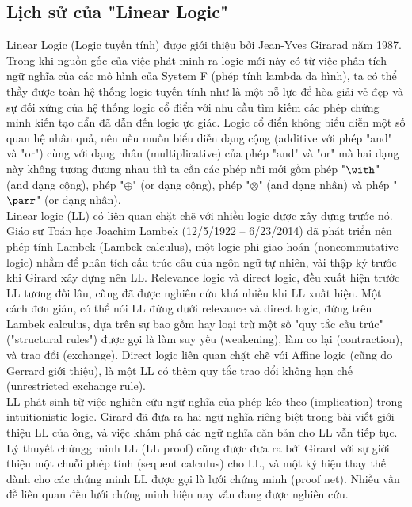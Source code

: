 \documentclass[a4paper]{article}
\begin{document}
\subsection{Lịch sử của "Linear Logic"}
Linear Logic (Logic tuyến tính) được giới thiệu bởi Jean-Yves Girarad năm 1987. Trong khi nguồn gốc của việc phát minh ra logic mới này có từ việc phân tích ngữ nghĩa của các mô hình của System F (phép tính lambda đa hình), ta có thể thầy được toàn hệ thống logic tuyến tính như là một nỗ lực để hòa giải vẻ đẹp và sự đối xứng của hệ thống logic cổ điển với nhu cầu tìm kiếm các phép chứng minh kiến tạo dẩn đã dẫn đến logic ực giác. 
Logic cổ điển không biểu diễn một số quan hệ nhân quả, nên nếu muốn biểu diễn dạng cộng (additive với phép "and" và "or") cùng với dạng nhân (multiplicative) của phép "and" và "or" mà hai dạng này không tương đương nhau thì ta cần các phép nối mới gồm phép "$\with$" (and dạng cộng), phép "$\oplus$" (or dạng cộng), phép "$\otimes$" (and dạng nhân) và phép "$\parr$" (or dạng nhân).\\

Linear logic (LL) có liên quan chặt chẽ với nhiều logic được xây dựng trước nó. Giáo sư Toán học Joachim Lambek (12/5/1922 – 6/23/2014) đã phát triển nên phép tính Lambek (Lambek calculus), một logic phi giao hoán (noncommutative logic) nhằm để phân tích cấu trúc câu của ngôn ngữ tự nhiên, vài thập kỷ trước khi Girard xây dựng nên LL. Relevance logic và direct logic, đều xuất hiện trước LL tương đối lâu, cũng đã được nghiên cứu khá nhiều khi LL xuất hiện. Một cách đơn giản, có thể nói LL đứng dưới relevance và direct logic, đứng trên Lambek calculus, dựa trên sự bao gồm hay loại trừ một số "quy tắc cấu trúc" ("structural rules") được gọi là làm suy yếu (weakening), làm co lại (contraction), và trao đổi (exchange). Direct logic liên quan chặt chẽ với Affine logic (cũng do Gerrard giới thiệu), là một LL có thêm quy tắc trao đổi không hạn chế (unrestricted exchange rule).\\

LL phát sinh từ việc nghiên cứu ngữ nghĩa của phép kéo theo (implication) trong intuitionistic logic. Girard đã đưa ra hai ngữ nghĩa riêng biệt trong bài viết giới thiệu LL của ông, và việc khám phá các ngữ nghĩa căn bản cho LL vẫn tiếp tục. Lý thuyết chứngg minh LL (LL proof) cũng được đưa ra bởi Girard với sự giới thiệu một chuỗi phép tính (sequent calculus) cho LL, và một ký hiệu thay thế dành cho các chứng minh LL được gọi là lưới chứng minh (proof net). Nhiều vấn đề liên quan đến lưới chứng minh hiện nay vẫn đang được nghiên cứu.\\
\end{document}
